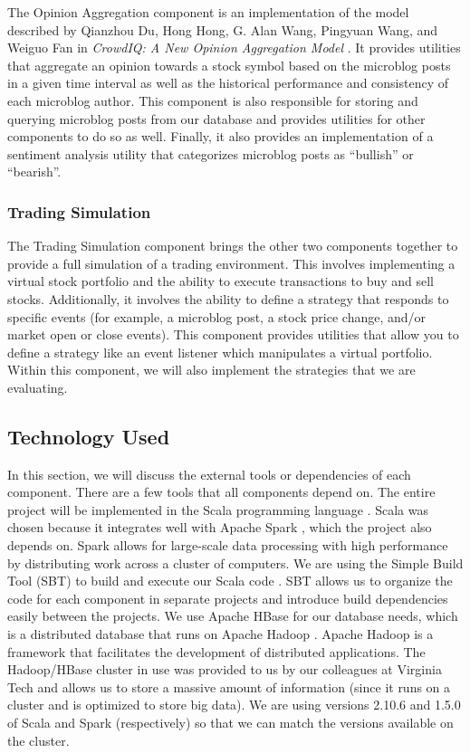 The Opinion Aggregation component is an implementation of the model described by Qianzhou Du, Hong Hong, G. Alan Wang, Pingyuan Wang, and Weiguo Fan in \textit{CrowdIQ: A New Opinion Aggregation Model} \cite{crowdiq}. It provides utilities that aggregate an opinion towards a stock symbol based on the microblog posts in a given time interval as well as the historical performance and consistency of each microblog author. This component is also responsible for storing and querying microblog posts from our database and provides utilities for other components to do so as well. Finally, it also provides an implementation of a sentiment analysis utility that categorizes microblog posts as ``bullish'' or ``bearish''.

\subsubsection{Trading Simulation}

The Trading Simulation component brings the other two components together to provide a full simulation of a trading environment. This involves implementing a virtual stock portfolio and the ability to execute transactions to buy and sell stocks. Additionally, it involves the ability to define a strategy that responds to specific events (for example, a microblog post, a stock price change, and/or market open or close events). This component provides utilities that allow you to define a strategy like an event listener which manipulates a virtual portfolio. Within this component, we will also implement the strategies that we are evaluating.

\subsection{Technology Used}

In this section, we will discuss the external tools or dependencies of each component. There are a few tools that all components depend on. The entire project will be implemented in the Scala programming language \cite{scala}. Scala was chosen because it integrates well with Apache Spark \cite{spark}, which the project also depends on. Spark allows for large-scale data processing with high performance by distributing work across a cluster of computers. We are using the Simple Build Tool (SBT) to build and execute our Scala code \cite{sbt}. SBT allows us to organize the code for each component in separate projects and introduce build dependencies easily between the projects. We use Apache HBase \cite{hbase} for our database needs, which is a distributed database that runs on Apache Hadoop \cite{hadoop}. Apache Hadoop is a framework that facilitates the development of distributed applications. The Hadoop/HBase cluster in use was provided to us by our colleagues at Virginia Tech and allows us to store a massive amount of information (since it runs on a cluster and is optimized to store big data). We are using versions 2.10.6 and 1.5.0 of Scala and Spark (respectively) so that we can match the versions available on the cluster.


